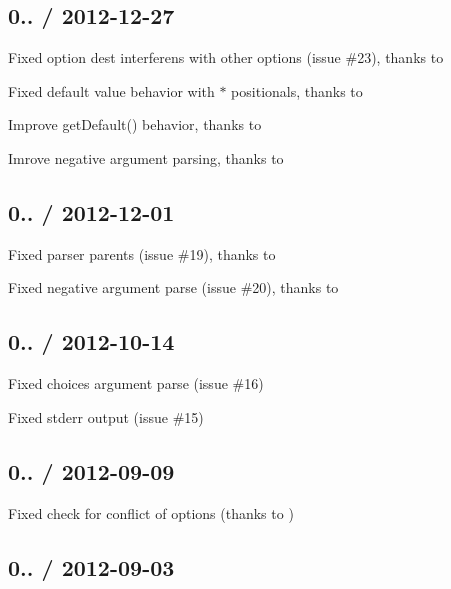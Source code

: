 \subsection*{0.. / 2012-\/12-\/27 }


\begin{DoxyItemize}
\item Fixed option dest interferens with other options (issue \#23), thanks to 
\item Fixed default value behavior with {\ttfamily $\ast$} positionals, thanks to 
\item Improve {\ttfamily get\+Default()} behavior, thanks to 
\item Imrove negative argument parsing, thanks to 
\end{DoxyItemize}

\subsection*{0.. / 2012-\/12-\/01 }


\begin{DoxyItemize}
\item Fixed parser parents (issue \#19), thanks to 
\item Fixed negative argument parse (issue \#20), thanks to 
\end{DoxyItemize}

\subsection*{0.. / 2012-\/10-\/14 }


\begin{DoxyItemize}
\item Fixed \textquotesingle{}choices\textquotesingle{} argument parse (issue \#16)
\item Fixed stderr output (issue \#15)
\end{DoxyItemize}

\subsection*{0.. / 2012-\/09-\/09 }


\begin{DoxyItemize}
\item Fixed check for conflict of options (thanks to )
\end{DoxyItemize}

\subsection*{0.. / 2012-\/09-\/03 }


